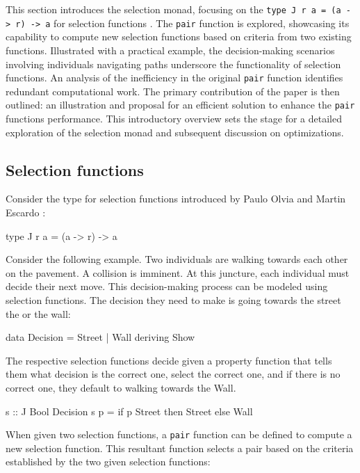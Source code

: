 \documentclass[runningheads]{llncs}
\begin{document}
This section introduces the selection monad, focusing on the
\texttt{type\ J\ r\ a\ =\ (a\ -\textgreater{}\ r)\ -\textgreater{}\ a}
for selection functions \cite{escardo2010selection}. The \texttt{pair}
function is explored, showcasing its capability to compute new selection
functions based on criteria from two existing functions. Illustrated
with a practical example, the decision-making scenarios involving
individuals navigating paths underscore the functionality of selection
functions. An analysis of the inefficiency in the original \texttt{pair}
function identifies redundant computational work. The primary
contribution of the paper is then outlined: an illustration and proposal
for an efficient solution to enhance the \texttt{pair} functions
performance. This introductory overview sets the stage for a detailed
exploration of the selection monad and subsequent discussion on
optimizations.

\subsection{Selection functions}\label{selection-functions}

Consider the type for selection functions introduced by Paulo Olvia and
Martin Escardo \cite{escardo2010selection} :

\begin{code}
type J r a = (a -> r) -> a
\end{code}

Consider the following example. Two individuals are walking towards each
other on the pavement. A collision is imminent. At this juncture, each
individual must decide their next move. This decision-making process can
be modeled using selection functions. The decision they need to make is
going towards the street the or the wall:

\begin{code}
data Decision = Street | Wall deriving Show
\end{code}

The respective selection functions decide given a property function that
tells them what decision is the correct one, select the correct one, and
if there is no correct one, they default to walking towards the Wall.

\begin{code}
s :: J Bool Decision
s p = if p Street then Street else Wall
\end{code}

When given two selection functions, a \texttt{pair} function can be
defined to compute a new selection function. This resultant function
selects a pair based on the criteria established by the two given
selection functions:
\end{document}

